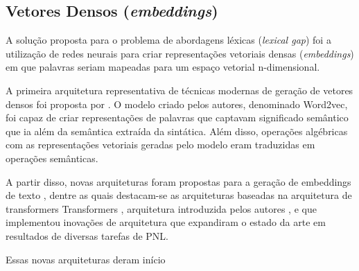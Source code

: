 \documentclass[
	12pt,				%
	openright,			%
	oneside,			%
	a4paper,			%
	english,			%
	french,				%
	spanish,			%
	brazil				%
	]{abntex2}
\begin{document}
\subsection{Vetores Densos (\textit{embeddings})}\label{subsec:vetores-densos-embeddings}

A solução proposta para o problema de abordagens léxicas (\textit{lexical gap}) foi a utilização de redes neurais para criar representações vetoriais densas (\textit{embeddings}) em que palavras seriam mapeadas para um espaço vetorial n-dimensional.

A primeira arquitetura representativa de técnicas modernas de geração de vetores densos foi proposta por \citeauthor{mikolov2013efficient}. O modelo criado pelos autores, denominado Word2vec, foi capaz de criar representações de palavras que captavam significado semântico que ia além da semântica extraída da sintática. Além disso, operações algébricas com as representações vetoriais geradas pelo modelo eram traduzidas em operações semânticas.


A partir disso, novas arquiteturas foram propostas para a geração de embeddings de texto \cite{}, dentre as quais destacam-se as arquiteturas baseadas na arquitetura de transformers Transformers \cite{}, arquitetura introduzida pelos autores \citeauthor{}, e que implementou inovações de arquitetura que expandiram o estado da arte em resultados de diversas tarefas de PNL. \cite{DBLP:journals/corr/abs-1810-04805}

Essas novas arquiteturas deram início






\end{document}
